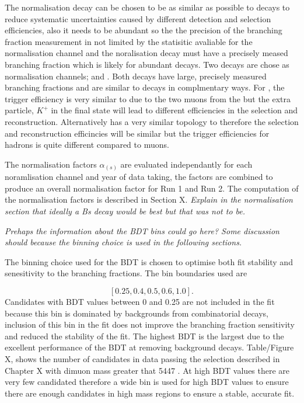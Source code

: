 The normalisation decay can be chosen to be as similar as possible to \bmumu decays to reduce systematic uncertainties caused by different detection and selection efficiencies, also it needs to be abundant so the the precision of the branching fraction measurement in not limited by the statisitic avaliable for the normalisation channel and the noralisation decay must have a precisely meased branching fraction which is likely for abundant decays. Two decays are chose as normalisation channels; \bujpsik and \bdkpi. Both decays have large, precisely measured branching fractions and are similar to \bmumu decays in complmentary ways. For \bujpisl, the trigger efficiency is very similar to \bmumu due to the two muons from the \jpsi but the extra particle, $K^{+}$ in the final state will lead to different efficiencies in the selection and reconstruction. Alternatively \bdkpi has a very similar topology to \bmumu therefore the selection and reconstruction efficincies will be similar but the trigger efficiencies for hadrons is quite different compared to muons.  

The normalisation factors $\alpha_{(s)}$ are evaluated independantly for each noramlisation channel and year of data taking, the factors are combined to produce an overall normalisation factor for Run 1 and Run 2. The computation of the normalisation factors is described in Section X. 
{\it Explain in the normalisation section that ideally a Bs decay would be best but that was not to be.}

{\it Prehaps the information about the BDT bins could go here? Some discussion should because the binning choice is used in the following sections.}

The binning choice used for the BDT is chosen to optimise both fit stability and senesitivity to the \bmumu branching fractions. The bin boundaries used are

\begin{equation}

[0.25, 0.4, 0.5, 0.6, 1.0].

\end{equation}
Candidates with BDT values between 0 and 0.25 are not included in the fit because this bin is dominated by backgrounds from combinatorial decays, inclusion of this bin in the fit does not improve the branching fraction sensitivity and reduced the stability of the fit. The highest BDT is the largest due to the excellent performance of the BDT at removing background decays. Table/Figure X, shows the number of \bmumu candidates in data passing the selection described in Chapter X with dimuon mass greater that 5447 \mevcc. At high BDT values there are very few candidated therefore a wide bin is used for high BDT values to ensure there are enough candidates in high mass regions to ensure a stable, accurate fit.


